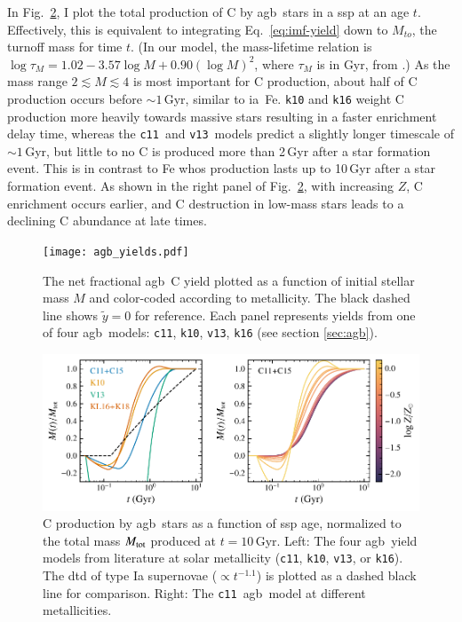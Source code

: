 \documentclass[12pt,oneside,letterpaper]{report}
\newcommand{\agb}{\gls{agb}}
\newcommand{\ia}{\gls{ia}}
\newcommand{\ssp}{\gls{ssp}}
\newcommand{\cxi}{\texttt{\gls{c11}}}
\newcommand{\kx}{\texttt{\gls{k10}}}
\newcommand{\kxvi}{\texttt{\gls{k16}}}
\newcommand{\vxiii}{\texttt{\gls{v13}}}
\newcommand{\about}[1]{${\sim} #1$}
\begin{document}
In Fig.~\ref{fig:agb-ssp}, I plot the total production of C by \agb\ stars in a \ssp{} at an age $t$. 
Effectively, this is equivalent to integrating Eq.~\ref{eq:imf-yield} down to $M_{to}$, the turnoff mass for time $t$.
({In our model, the mass-lifetime relation is
$\log \tau_M = 1.02 - 3.57\log M + 0.90 \left(\log M\right)^2$,
where $\tau_M$ is in Gyr,
from \citealt{larson74}.})
As the mass range $2\lesssim M \lesssim 4$ is most important for C production, about half of C production occurs before \about{1}\,Gyr, similar to \ia\ Fe. 
\kx{} and \kxvi{} weight C production more heavily towards massive stars resulting in a faster enrichment delay time, whereas the \cxi\ and \vxiii\ models predict a slightly longer timescale of \about{1}\,Gyr, but little to no C is produced more than 2\,Gyr after a star formation event. This is in contrast to Fe whos production lasts up to 10\,Gyr after a star formation event. As shown in the right panel of Fig.~\ref{fig:agb-ssp}, with increasing $Z$, C enrichment occurs earlier, and C destruction in low-mass stars leads to a declining C abundance at late times.
    

\begin{figure}[htp]
    \centering
 	    \texttt{[image: agb\_yields.pdf]}
        \caption[Low mass C yields]{The net fractional \agb\ C yield  plotted as a function of initial stellar mass $M$ and color-coded according to metallicity. The black dashed line shows $\tilde{y}=0$ for reference. Each panel represents yields from one of four \agb\ models: \cxi, \kx{}, \vxiii{}, \kxvi{} (see section \ref{sec:agb}). }
        \label{fig:y_agb}
\end{figure}
\begin{figure}[htp]
    \centering
    \includegraphics[scale=1]{y_agb_t2.pdf}

    \caption[C yields delay time distribution]{
    C production by \agb\ stars as a function of \ssp{} age, normalized to the total mass $M_{\rm tot}$ produced at $t=10$\,Gyr. Left: The four \agb\ yield models from literature at solar metallicity (\cxi, \kx{}, \vxiii{}, or \kxvi{}). The \gls{dtd} of type Ia supernovae ($\propto t^{-1.1}$) is plotted as a dashed black line for comparison. Right: The \cxi\ \agb\ model at different metallicities. }
    \label{fig:agb-ssp}
\end{figure}
\end{document}
